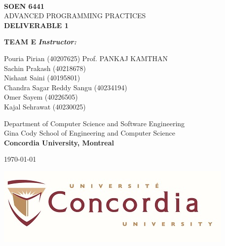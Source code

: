 \begin{titlepage}
    \begin{center}
        \textbf{\Large\\ SOEN 6441}
        \vspace{1cm}
        \Huge\\ ADVANCED PROGRAMMING PRACTICES
        \vspace{1cm}
        \textbf{\Huge\\DELIVERABLE 1}\\
        \vspace{2cm}
    
        \Large \textbf{TEAM E} \hfill  \textit{\textbf{Instructor:}}\\
        \begin{large}
            \begin{flushleft}
                \vspace{.1cm}
                Pouria Pirian (40207625) \hfill Prof. PANKAJ KAMTHAN\\
                Sachin Prakash (40218678)\\
                Nishant	Saini (40195801)\\
                Chandra Sagar Reddy	Sangu (40234194)\\
                Omer Sayem (40226505)\\
                Kajal Sehrawat (40230025)\\
            \end{flushleft}
        \end{large}
    
        \begin{Large}  
            \vspace{1 cm}
            Department of Computer Science and Software Engineering \\
            Gina Cody School of Engineering and Computer Science \\
            \textbf{Concordia University, Montreal}\\
            \vspace{1 cm}
    
            \today \\
        \end{Large}
    \end{center}
  
    \vfill
    \begin{center}
      \includegraphics[width = 50ex]{resources/concordia_med.jpg}
    \end{center}    
\end{titlepage}
